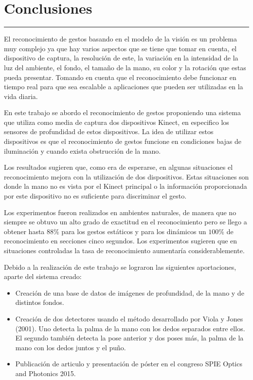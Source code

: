 \chapter{Conclusiones}\label{capit:cap6}
\vspace{-2.0325ex}%
\noindent
\rule{\textwidth}{0.5pt}
\vspace{-5.5ex}%
\newcommand{\pushline}{\Indp}%

El reconocimiento de gestos basando en el modelo de la visión es un problema muy complejo ya que hay varios aspectos que se tiene que tomar en cuenta, el dispositivo de captura, la resolución de este, la variación en la intensidad de la luz del ambiente, el fondo, el tamaño de la mano, su color y la rotación que estas pueda presentar. Tomando en cuenta que el reconocimiento debe funcionar en tiempo real para que sea escalable a aplicaciones que pueden ser utilizadas en la vida diaria. 

En este trabajo se abordo el reconocimiento de gestos proponiendo una sistema que utiliza como media de captura dos dispositivos Kinect, en especifico los sensores de profundidad de estos dispositivos. La idea de utilizar estos dispositivos es que el reconocimiento de gestos funcione en condiciones bajas de iluminación y cuando exista obstrucción de la mano.  

Los resultados sugieren que, como era de esperarse, en algunas situaciones el reconocimiento mejora con la utilización de dos dispositivos. Estas situaciones son donde la mano no es vista por el Kinect principal o la información proporcionada por este dispositivo no es suficiente para discriminar el gesto.
   
Los experimentos fueron realizados en ambientes naturales, de manera que no siempre se obtuvo un alto grado de exactitud en el reconocimiento pero se llego a obtener hasta $88 \%$ para los gestos estáticos y para los dinámicos un $100 \%$ de reconocimiento en secciones cinco segundos. Los experimentos sugieren que en situaciones controladas la tasa de reconocimiento aumentaría considerablemente. 

Debido a la realización de este trabajo se lograron las siguientes aportaciones, aparte del sistema creado: 
 
\begin{itemize}
\item Creación de una base de datos de imágenes de profundidad, de la mano y de distintos fondos.   

\item Creación de dos detectores usando el método desarrollado por Viola y Jones (2001). Uno detecta la palma de la mano con los dedos separados entre ellos. El segundo también detecta la pose anterior y dos poses más, la palma de la mano con los dedos juntos y el puño. 

\item Publicación de articulo y presentación de póster en el congreso SPIE Optics and Photonics 2015.     

\end{itemize}


